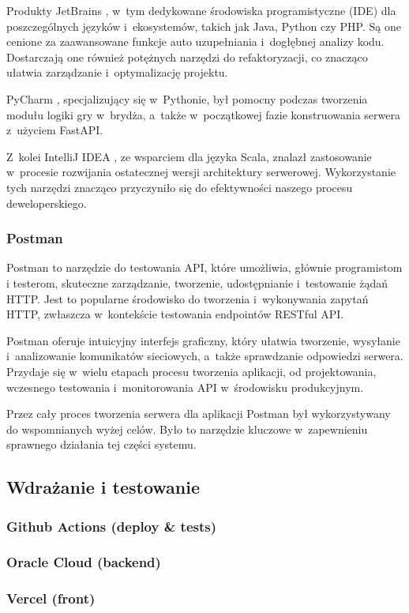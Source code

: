 Produkty JetBrains \cite{JetBrains}, w~tym dedykowane środowiska
programistyczne (IDE) dla poszczególnych języków i~ekosystemów,
takich jak Java, Python czy PHP.
Są one cenione za zaawansowane funkcje auto uzupełniania i~dogłębnej
analizy kodu. Dostarczają one również potężnych narzędzi do refaktoryzacji,
co znacząco ułatwia zarządzanie i~optymalizację projektu.

PyCharm \cite{PyCharm}, specjalizujący się w~Pythonie, był pomocny podczas tworzenia
modułu logiki gry w~brydża, a~także w~początkowej fazie konstruowania
serwera z~użyciem FastAPI.

Z~kolei IntelliJ IDEA \cite{Intellij}, ze wsparciem dla języka
Scala, znalazł zastosowanie w~procesie rozwijania ostatecznej wersji
architektury serwerowej. Wykorzystanie tych narzędzi znacząco przyczyniło
się do efektywności naszego procesu deweloperskiego.

\subsubsection{Postman}

Postman \cite{Postman} to narzędzie do testowania API, które umożliwia, głównie
programistom i testerom, skuteczne zarządzanie, tworzenie, udostępnianie
i~testowanie żądań HTTP. Jest to popularne środowisko do tworzenia
i~wykonywania zapytań HTTP, zwłaszcza w~kontekście testowania
endpointów RESTful API.

Postman oferuje intuicyjny interfejs graficzny, który ułatwia tworzenie,
wysyłanie i~analizowanie komunikatów sieciowych, a~także sprawdzanie
odpowiedzi serwera. Przydaje się w~wielu etapach procesu tworzenia
aplikacji, od projektowania, wczesnego testowania i~monitorowania API
w~środowisku produkcyjnym.

Przez cały proces tworzenia serwera dla aplikacji Postman był wykorzystywany
do wspomnianych wyżej celów. Było to narzędzie kluczowe w~zapewnieniu
sprawnego działania tej części systemu.


\subsection{Wdrażanie i testowanie}

\subsubsection{Github Actions (deploy \& tests)}


\subsubsection{Oracle Cloud (backend)}

\subsubsection{Vercel (front)}
